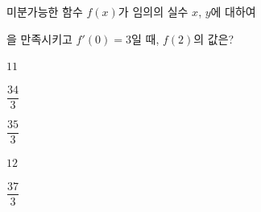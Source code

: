 미분가능한 함수 $f(x)$가 임의의 실수 $x$, $y$에 대하여 \par\smallskip{}\par\smallskip\noindent 을 만족시키고 $f'(0)=3$일 때, $f(2)$의 값은?
\begin{choices32}{\rule[-3ex]{0pt}{8ex}$11$}{\rule[-3ex]{0pt}{8ex}$\dfrac{34}{3}$}{\rule[-3ex]{0pt}{8ex}$\dfrac{35}{3}$}{\rule[-3ex]{0pt}{8ex}$12$}{\rule[-3ex]{0pt}{8ex}$\dfrac{37}{3}$}\end{choices32}

